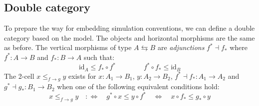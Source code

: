 \documentclass[sigplan,10pt,review,anonymous]{acmart}
\begin{document}
%
%
%

\subsection{Double category} %

To prepare the way for embedding simulation conventions,
we can define a double category based on the model.
The objects and horizontal morphisms
are the same as before.
The vertical morphisms of type $A \leftrightarrows B$
are \emph{adjunctions} $f^* \dashv f_*$
where $f^* : A \rightarrow B$ and $f_* : B \rightarrow A$
such that:
\[
  \mathrm{id}_A \le f_* \circ f^*
  \qquad \qquad
  f^* \circ f_* \le \mathrm{id}_B
\]
The 2-cell $x \le_{f \rightarrow g} y$
exists for
$x : A_1 \rightarrow B_1$,
$y : A_2 \rightarrow B_2$,
$f^* \dashv f_* : A_1 \rightarrow A_2$ and
$g^* \dashv g_* : B_1 \rightarrow B_2$
when one of the following equivalent conditions hold:
\begin{equation} \label{eqn:gc}
  x \le_{f \rightarrow g} y
  \quad :\Leftrightarrow \quad
  g^* \circ x \le y \circ f^*
  \quad \Leftrightarrow \quad
  x \circ f_* \le g_* \circ y
\end{equation}
\end{document}
